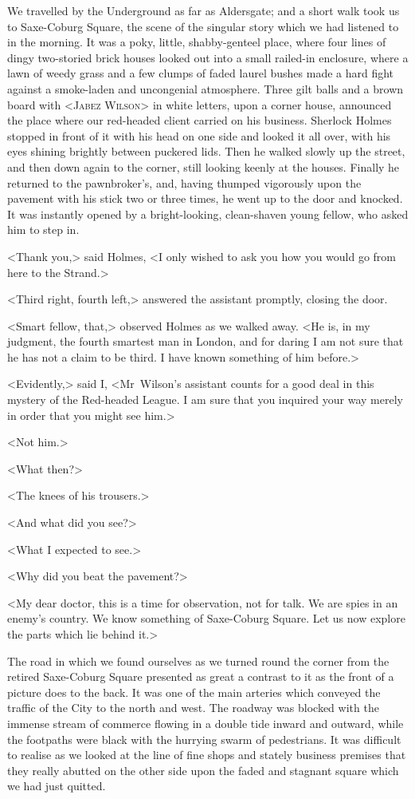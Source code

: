 We travelled by the Underground as far as Aldersgate; and a short walk took us to Saxe-Coburg Square, the scene of the singular story which we had listened to in the morning. It was a poky, little, shabby-genteel place, where four lines of dingy two-storied brick houses looked out into a small railed-in enclosure, where a lawn of weedy grass and a few clumps of faded laurel bushes made a hard fight against a smoke-laden and uncongenial atmosphere. Three gilt balls and a brown board with <\textsc{Jabez Wilson}> in white letters, upon a corner house, announced the place where our red-headed client carried on his business. Sherlock Holmes stopped in front of it with his head on one side and looked it all over, with his eyes shining brightly between puckered lids. Then he walked slowly up the street, and then down again to the corner, still looking keenly at the houses. Finally he returned to the pawnbroker's, and, having thumped vigorously upon the pavement with his stick two or three times, he went up to the door and knocked. It was instantly opened by a bright-looking, clean-shaven young fellow, who asked him to step in.

<Thank you,> said Holmes, <I only wished to ask you how you would go from here to the Strand.>

<Third right, fourth left,> answered the assistant promptly, closing the door.

<Smart fellow, that,> observed Holmes as we walked away. <He is, in my judgment, the fourth smartest man in London, and for daring I am not sure that he has not a claim to be third. I have known something of him before.>

<Evidently,> said I, <Mr~Wilson's assistant counts for a good deal in this mystery of the Red-headed League. I am sure that you inquired your way merely in order that you might see him.>

<Not him.>

<What then?>

<The knees of his trousers.>

<And what did you see?>

<What I expected to see.>

<Why did you beat the pavement?>

<My dear doctor, this is a time for observation, not for talk. We are spies in an enemy's country. We know something of Saxe-Coburg Square. Let us now explore the parts which lie behind it.>

The road in which we found ourselves as we turned round the corner from the retired Saxe-Coburg Square presented as great a contrast to it as the front of a picture does to the back. It was one of the main arteries which conveyed the traffic of the City to the north and west. The roadway was blocked with the immense stream of commerce flowing in a double tide inward and outward, while the footpaths were black with the hurrying swarm of pedestrians. It was difficult to realise as we looked at the line of fine shops and stately business premises that they really abutted on the other side upon the faded and stagnant square which we had just quitted.

